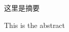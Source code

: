 \begin{cabstract}

这里是摘要

\end{cabstract}

\begin{eabstract}

This is the abstract

\end{eabstract}


